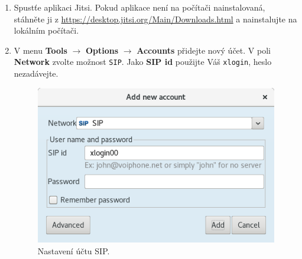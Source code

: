 \begin{enumerate}
    \item Spustťe aplikaci Jitsi. Pokud aplikace není na počítači nainstalovaná, stáhněte ji z \url{https://desktop.jitsi.org/Main/Downloads.html} a nainstalujte na lokálním počítači. 
    \item V menu {\bf Tools} $\rightarrow$ {\bf Options} $\rightarrow$ {\bf Accounts} přidejte nový účet. V poli {\bf Network} zvolte možnost {\tt SIP}. Jako {\bf SIP id} použijte Váš {\tt xlogin}, heslo nezadávejte.
    \begin{figure}[h]
    	\centering
    	\includegraphics[scale=0.5]{img/account_p2p.png}
    	\caption{Nastavení účtu SIP.}
    	\label{fig:sip_account}
    \end{figure}


\end{enumerate}
